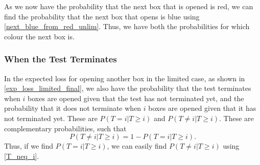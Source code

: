 As we now have the probability that the next box that is opened is red, we can find the probability that the next box that opens is blue using \eqref{next_blue_from_red_unlim}. Thus, we have both the probabilities for which colour the next box is. 



\subsubsection{When the Test Terminates}
In the expected loss for opening another box in the limited case, as shown in \eqref{exp_loss_limited_final}, we also have the probability that the test terminates when $i$ boxes are opened given that the test has not terminated yet, 
and the probability that it does not terminate when $i$ boxes are opened given that it has not terminated yet. 
These are $P(T=i|T\geq i)$ and $P(T\neq i|T\geq i)$. These are complementary probabilities, such that
\begin{equation}
\label{T_neq_i}
    P(T \neq i|T\geq i) = 1-P(T=i|T\geq i).
\end{equation}
Thus, if we find $P(T=i|T\geq i)$, we can easily find $P(T\neq i|T\geq i)$ using \eqref{T_neq_i}. 

